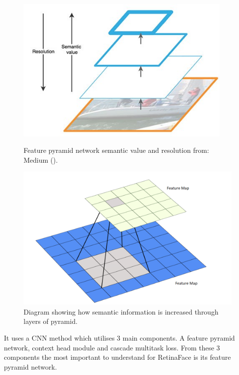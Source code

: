 \documentclass{l4proj}
\begin{document}
\begin{figure}[h!]
  \centering
    \begin{minipage}{0.49\textwidth}
    \includegraphics[width=0.94\textwidth]{images/fp_semantics.jpeg}
     \vspace*{-0.6mm}
    \caption{Feature pyramid network semantic value and resolution from: Medium (\cite{fpnsemantic}).}
    \label{fpnsemantic}
  \end{minipage}
  \hfill
  \centering
  \begin{minipage}{0.49\textwidth}
    \includegraphics[width=\textwidth]{images/fp_scaling.PNG}
    \caption{Diagram showing how semantic information is increased through layers of pyramid.}
    \label{fp_scaling}
  \end{minipage}
  \hfill
\end{figure}
It uses a CNN method which utilises 3 main components. A feature pyramid network, context head module and cascade multitask loss. From these 3 components the most important to understand for RetinaFace is its feature pyramid network.
\end{document}
